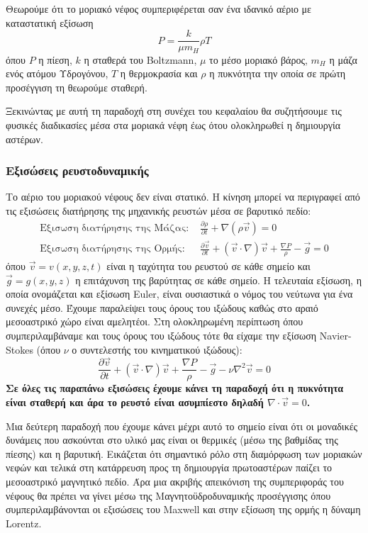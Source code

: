 \documentclass[a4paper,12pt]{memoir}
\newcommand{\pt}[1]{\frac{\partial #1}{\partial t}}
\newcommand{\vv}{\vec{v}}
\begin{document}
Θεωρούμε ότι το μοριακό νέφος συμπεριφέρεται σαν ένα ιδανικό αέριο με καταστατική εξίσωση
\begin{equation}
P=\frac{k}{\mu m_{H}} \rho T
\end{equation}
όπου $P$ η πίεση, $k$ η σταθερά του Boltzmann, $\mu$ το μέσο μοριακό βάρος, $m_{H}$ η μάζα ενός ατόμου Υδρογόνου, $T$ η θερμοκρασία και $\rho$ η πυκνότητα την οποία σε πρώτη προσέγγιση τη θεωρούμε σταθερή.

Ξεκινώντας με αυτή τη παραδοχή στη συνέχει του κεφαλαίου θα συζητήσουμε τις φυσικές διαδικασίες μέσα στα μοριακά νέφη έως ότου ολοκληρωθεί η δημιουργία αστέρων.

\subsubsection{Εξισώσεις ρευστοδυναμικής}
Το αέριο του μοριακού νέφους δεν είναι στατικό. Η κίνηση μπορεί να περιγραφεί από τις εξισώσεις διατήρησης της μηχανικής ρευστών μέσα σε βαρυτικό πεδίο:
\begin{align}
\text{Εξισωση διατήρησης της Μάζας:  } &\pt{\rho} + \nabla (\rho \vv)=0 \\
\text{Εξισωση διατήρησης της Ορμής:  } &\pt{\vv} +(\vv \cdot \nabla) \vv +\frac{\nabla P}{\rho} -\vec{g}=0
\label{eq:euler}
\end{align}
όπου $\vv=v(x,y,z,t)$ είναι η ταχύτητα του ρευστού σε κάθε σημείο και $\vec{g}=g(x,y,z)$ η επιτάχυνση της βαρύτητας σε κάθε σημείο.
Η τελευταία εξίσωση, η οποία ονομάζεται και εξίσωση Euler, είναι ουσιαστικά ο νόμος του νεύτωνα για ένα συνεχές μέσο.
Έχουμε παραλείψει τους όρους του ιξώδους καθώς στο αραιό μεσοαστρικό χώρο είναι αμελητέοι. Στη ολοκληρωμένη περίπτωση όπου συμπεριλαμβάναμε και τους όρους του ιξώδους τότε θα είχαμε την εξίσωση Navier-Stokes (όπου $\nu$ ο συντελεστής του κινηματικού ιξώδους): 
$$
\pt{\vv} +(\vv \cdot \nabla) \vv +\frac{\nabla P}{\rho} -\vec{g}-\nu \nabla ^2 \vv=0
$$
\textbf{Σε όλες τις παραπάνω εξισώσεις έχουμε κάνει τη παραδοχή ότι η πυκνότητα είναι σταθερή και άρα το ρευστό είναι ασυμπίεστο δηλαδή $\nabla \cdot \vv = 0$.}

Μια δεύτερη παραδοχή που έχουμε κάνει μέχρι αυτό το σημείο είναι ότι οι μοναδικές δυνάμεις που ασκούνται στο υλικό μας είναι οι θερμικές (μέσω της βαθμίδας της πίεσης) και η βαρυτική. Εικάζεται ότι σημαντικό ρόλο στη διαμόρφωση των μοριακών νεφών και τελικά στη κατάρρευση προς τη δημιουργία πρωτοαστέρων παίζει το μεσοαστρικό μαγνητικό πεδίο. Άρα μια ακριβής απεικόνιση της συμπεριφοράς του νέφους θα πρέπει να γίνει μέσω της Μαγνητοϋδροδυναμικής προσέγγισης όπου συμπεριλαμβάνονται οι εξισώσεις του Maxwell και στην εξίσωση της ορμής η δύναμη Lorentz.    
\end{document}
